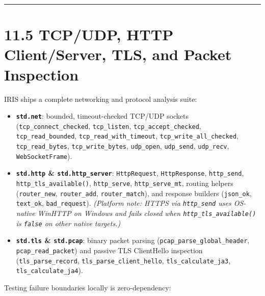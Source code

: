\documentclass[
  english,
  oneside]{book}
\begin{document}
\begin{center}\rule{0.5\linewidth}{0.5pt}\end{center}

\section{11.5 TCP/UDP, HTTP Client/Server, TLS, and Packet
Inspection}\label{tcpudp-http-clientserver-tls-and-packet-inspection}

IRIS ships a complete networking and protocol analysis suite:

\begin{itemize}
\item
  \textbf{\texttt{std.net}}: bounded, timeout-checked TCP/UDP sockets
  (\texttt{tcp\_connect\_checked}, \texttt{tcp\_listen},
  \texttt{tcp\_accept\_checked}, \texttt{tcp\_read\_bounded},
  \texttt{tcp\_read\_with\_timeout}, \texttt{tcp\_write\_all\_checked},
  \texttt{tcp\_read\_bytes}, \texttt{tcp\_write\_bytes},
  \texttt{udp\_open}, \texttt{udp\_send}, \texttt{udp\_recv},
  \texttt{WebSocketFrame}).
\item
  \textbf{\texttt{std.http} \& \texttt{std.http\_server}}:
  \texttt{HttpRequest}, \texttt{HttpResponse}, \texttt{http\_send},
  \texttt{http\_tls\_available()}, \texttt{http\_serve},
  \texttt{http\_serve\_mt}, routing helpers (\texttt{router\_new},
  \texttt{router\_add}, \texttt{router\_match}), and response builders
  (\texttt{json\_ok}, \texttt{text\_ok}, \texttt{bad\_request}).
  \emph{(Platform note: HTTPS via \texttt{http\_send} uses OS-native
  WinHTTP on Windows and fails closed when
  \texttt{http\_tls\_available()} is \texttt{false} on other native
  targets.)}
\item
  \textbf{\texttt{std.tls} \& \texttt{std.pcap}}: binary packet parsing
  (\texttt{pcap\_parse\_global\_header}, \texttt{pcap\_read\_packet})
  and passive TLS ClientHello inspection (\texttt{tls\_parse\_record},
  \texttt{tls\_parse\_client\_hello}, \texttt{tls\_calculate\_ja3},
  \texttt{tls\_calculate\_ja4}).
\end{itemize}

Testing failure boundaries locally is zero-dependency:
\end{document}

